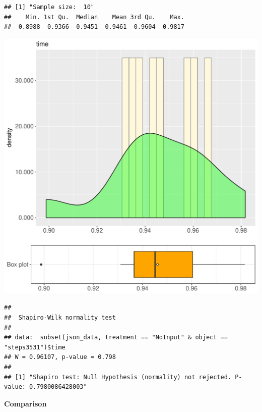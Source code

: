 \documentclass{article}\usepackage[]{graphicx}\usepackage[]{color}
\makeatletter
\def\maxwidth{ %
  \ifdim\Gin@nat@width>\linewidth
    \linewidth
  \else
    \Gin@nat@width
  \fi
}
\newenvironment{kframe}{%
 \def\at@end@of@kframe{}%
 \ifinner\ifhmode%
  \def\at@end@of@kframe{\end{minipage}}%
  \begin{minipage}{\columnwidth}%
 \fi\fi%
 \def\FrameCommand##1{\hskip\@totalleftmargin \hskip-\fboxsep
 \colorbox{shadecolor}{##1}\hskip-\fboxsep
     \hskip-\linewidth \hskip-\@totalleftmargin \hskip\columnwidth}%
 \MakeFramed {\advance\hsize-\width
   \@totalleftmargin\z@ \linewidth\hsize
   \@setminipage}}%
 {\par\unskip\endMakeFramed%
 \at@end@of@kframe}
\newenvironment{knitrout}{}{} %
\makeatother
\begin{document}
\begin{knitrout}
\color{fgcolor}\begin{kframe}
\begin{verbatim}
## [1] "Sample size:  10"
##    Min. 1st Qu.  Median    Mean 3rd Qu.    Max. 
##  0.8988  0.9366  0.9451  0.9461  0.9604  0.9817
\end{verbatim}
\end{kframe}
\includegraphics[width=\maxwidth]{figure/RH4_NoInput_steps3531-1} 
\begin{kframe}\begin{verbatim}
## 
## 	Shapiro-Wilk normality test
## 
## data:  subset(json_data, treatment == "NoInput" & object == "steps3531")$time
## W = 0.96107, p-value = 0.798
## 
## [1] "Shapiro test: Null Hypothesis (normality) not rejected. P-value: 0.7980086428003"
\end{verbatim}
\end{kframe}
\end{knitrout}
  
 \textbf{Comparison}
  
\end{document}
